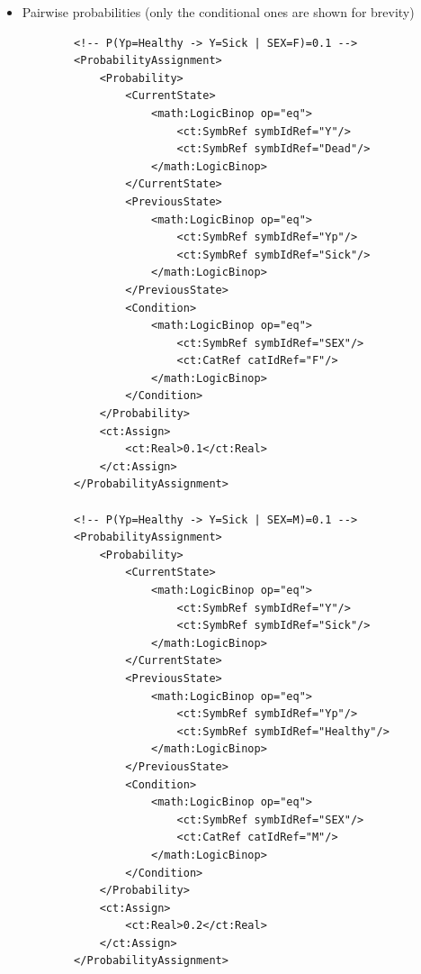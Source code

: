 \begin{itemize}
\item
Pairwise probabilities (only the conditional ones are shown for brevity)

\lstset{language=XML}
\begin{lstlisting}
        <!-- P(Yp=Healthy -> Y=Sick | SEX=F)=0.1 -->
        <ProbabilityAssignment>
            <Probability>
                <CurrentState>
                    <math:LogicBinop op="eq">
                        <ct:SymbRef symbIdRef="Y"/>
                        <ct:SymbRef symbIdRef="Dead"/>
                    </math:LogicBinop>
                </CurrentState>
                <PreviousState>
                    <math:LogicBinop op="eq">
                        <ct:SymbRef symbIdRef="Yp"/>
                        <ct:SymbRef symbIdRef="Sick"/>
                    </math:LogicBinop>
                </PreviousState>
                <Condition>
                    <math:LogicBinop op="eq">
                        <ct:SymbRef symbIdRef="SEX"/>
                        <ct:CatRef catIdRef="F"/>
                    </math:LogicBinop>
                </Condition>
            </Probability>
            <ct:Assign>
                <ct:Real>0.1</ct:Real>
            </ct:Assign>
        </ProbabilityAssignment>
        
        <!-- P(Yp=Healthy -> Y=Sick | SEX=M)=0.1 -->
        <ProbabilityAssignment>
            <Probability>
                <CurrentState>
                    <math:LogicBinop op="eq">
                        <ct:SymbRef symbIdRef="Y"/>
                        <ct:SymbRef symbIdRef="Sick"/>
                    </math:LogicBinop>
                </CurrentState>
                <PreviousState>
                    <math:LogicBinop op="eq">
                        <ct:SymbRef symbIdRef="Yp"/>
                        <ct:SymbRef symbIdRef="Healthy"/>
                    </math:LogicBinop>
                </PreviousState>
                <Condition>
                    <math:LogicBinop op="eq">
                        <ct:SymbRef symbIdRef="SEX"/>
                        <ct:CatRef catIdRef="M"/>
                    </math:LogicBinop>
                </Condition>
            </Probability>
            <ct:Assign>
                <ct:Real>0.2</ct:Real>
            </ct:Assign>
        </ProbabilityAssignment>
\end{lstlisting}


\end{itemize}
